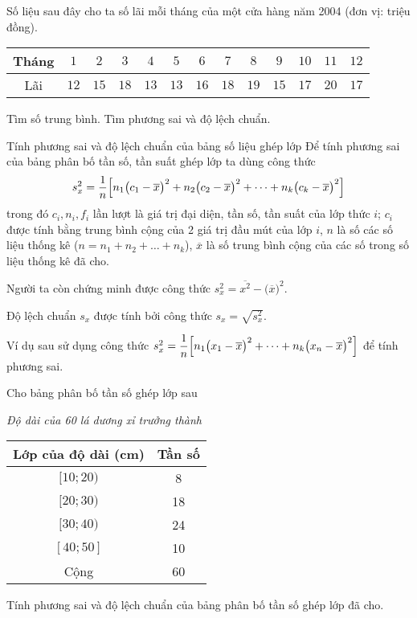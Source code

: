 \begin{bt}%
	Số liệu sau đây cho ta số lãi mỗi tháng của một cửa hàng năm 2004 (đơn vị: triệu đồng).
	\begin{center}
		\begin{tabular}{|c|c|c|c|c|c|c|c|c|c|c|c|c|}
			\hline 
			Tháng & $1$ & $2$ & $3$ & $4$ & $5$ & $6$ & $7$ & $8$ & $9$ & $10$ & $11$ & $12$ \\ 
			\hline 
			Lãi & $12$ & $15$ & $18$ & $13$ & $13$ & $16$ & $18$ & $19$ & $15$ & $17$ & $20$ & $17$ \\ 
			\hline 
		\end{tabular} 
	\end{center}
	Tìm số trung bình. Tìm phương sai và độ lệch chuẩn.
\end{bt}


\begin{dang}{Tính phương sai và độ lệch chuẩn của bảng số liệu ghép lớp}
	Để tính phương sai của bảng phân bố tần số, tần suất ghép lớp ta dùng công thức
	$$s_x^2=\dfrac{1}{n}\Bigl[n_1\bigl(c_1-\overline{x}\bigr)^2+n_2\bigl(c_2-\overline{x}\bigr)^2+\dots+n_k\bigl(c_k-\overline{x}\bigr)^2\Bigr]$$
	trong đó $c_i,n_i,f_i$ lần lượt là giá trị đại diện, tần số, tần suất của lớp thức $i$; $c_i$ được tính bằng trung bình cộng của 2 giá trị đầu mút của lớp $i$, $n$ là số các số liệu thống kê ($n=n_1+n_2+\dots+n_k$), $\overline{x}$ là số trung bình cộng của các số trong số liệu thống kê đã cho.
	\begin{note}
		Người ta còn chứng minh được công thức $s_x^2=\overline{x^2}-\bigl(\overline{x}\bigr)^2$.
	\end{note}
	Độ lệch chuẩn $s_x$ được tính bởi công thức $s_x=\sqrt{s_x^2}$.
\end{dang}
Ví dụ sau sử dụng công thức $s_x^2=\dfrac{1}{n}\Bigl[n_1\bigl(x_1-\overline{x}\bigr)^2+\dots+n_k\bigl(x_n-\overline{x}\bigr)^2\Bigr]$ để tính phương sai.
\begin{vd}%
	Cho bảng phân bố tần số ghép lớp sau
	\begin{center}
		\emph{Độ dài của 60 lá dương xỉ trưởng thành}\\
		\begin{tabular}{|c|c|}
			\hline
			Lớp của độ dài (cm)	& Tần số\\\hline
			$[10;20)$ & 8\\
			$[20;30)$ & 18\\
			$[30;40)$ & 24\\
			$[40;50]$ & 10\\\hline
			Cộng & 60 \\\hline
		\end{tabular}
	\end{center}
	Tính phương sai và độ lệch chuẩn của bảng phân bố tần số ghép lớp đã cho.
\end{vd}

